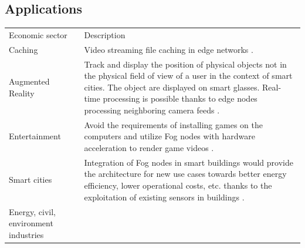 \documentclass[11pt]{sdm}
\begin{document}
\subsection {Applications}

\begin{table}[t]
	\fontsize{10}{8}\selectfont
	\begin{tabular}{@{} p{3cm}|p{12cm} @{}}
		Economic sector & Description
		\\[2ex]
		\cmidrule[1pt]{1-2}
		Caching
		                & Video streaming file caching in edge networks \cite{ma_understanding_2017}.
		\\
		Augmented Reality
		                & Track and display the position of physical objects not in the physical field of view of a user in the context of smart cities. The object are displayed on smart glasses. Real-time processing is possible thanks to edge nodes processing neighboring camera feeds \cite{rausch_towards_2021, rausch_cognitivexr_2020}.
		\\
		Entertainment
		                & Avoid the requirements of installing games on the computers and utilize Fog nodes with hardware acceleration to render game videos \cite{lin_cloudfog_2017}.
		\\
		Smart cities
		                & Integration of Fog nodes in smart buildings would provide the architecture for new use cases towards better energy efficiency, lower operational costs, etc. thanks to the exploitation of existing sensors in buildings \cite{ieee_standards_association_smart_2018}.
		\\
		Energy, civil, environment industries

\end{tabular}
\end{table}
\end{document}
